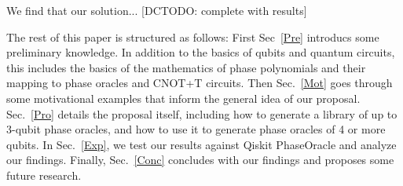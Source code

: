 We find that our solution... [DCTODO: complete with results]

The rest of this paper is structured as follows: First Sec~\ref{Pre}
introducs some preliminary knowledge. In addition to the basics of
qubits and quantum circuits, this includes the basics of the
mathematics of phase polynomials and their mapping to phase oracles
and CNOT+T circuits. Then Sec.~\ref{Mot} goes through some
motivational examples that inform the general idea of our proposal.
Sec.~\ref{Pro} details the proposal itself, including how to
generate a library of up to 3-qubit phase oracles, and how to use
it to generate phase oracles of 4 or more qubits. In Sec.~\ref{Exp},
we test our results against Qiskit PhaseOracle and analyze our
findings. Finally, Sec.~\ref{Conc} concludes with our findings and
proposes some future research.

